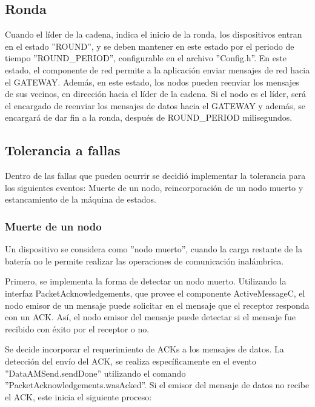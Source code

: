  \subsection{Ronda}
 Cuando el líder de la cadena, indica el inicio de la ronda, los dispositivos entran en el estado ''ROUND'', y se deben mantener en este estado por el periodo de tiempo ''ROUND\_PERIOD'', configurable en el archivo ''Config.h''. En este estado, el componente de red permite a la aplicación enviar mensajes de red hacia el GATEWAY. Además, en este estado, los nodos pueden reenviar los mensajes de sus vecinos, en dirección hacia el líder de la cadena. Si el nodo es el líder, será el encargado de reenviar los mensajes de datos hacia el GATEWAY y además, se encargará de dar fin a la ronda, después de ROUND\_PERIOD milisegundos.

\subsection{Tolerancia a fallas}
Dentro de las fallas que pueden ocurrir se decidió implementar la tolerancia para los siguientes eventos: Muerte de un nodo, reincorporación de un nodo muerto y estancamiento de la máquina de estados.

\subsubsection{Muerte de un nodo}
Un dispositivo se considera como ''nodo muerto'', cuando la carga restante de la batería  no le permite realizar las operaciones de comunicación inalámbrica.

Primero, se implementa la forma de detectar un nodo muerto. Utilizando la interfaz PacketAcknowledgements, que provee el componente ActiveMessageC,  el nodo emisor de un mensaje puede solicitar en el mensaje que el receptor responda con un ACK. Así, el nodo emisor del mensaje puede detectar si el mensaje fue recibido con éxito por el receptor o no. 

Se decide incorporar el requerimiento de ACKs a los mensajes de datos. La detección del envío del ACK, se realiza específicamente en el evento ''DataAMSend.sendDone'' utilizando el comando ''PacketAcknowledgements.wasAcked''. Si el emisor del mensaje de datos no recibe el ACK, este inicia el siguiente proceso:

